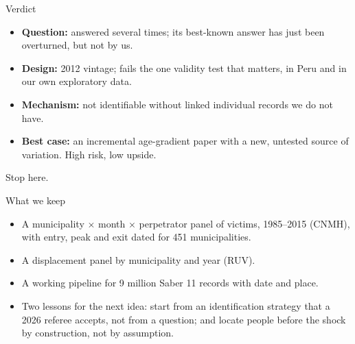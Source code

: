 \documentclass[aspectratio=169,11pt]{beamer}
\newcommand{\acc}[1]{{\color{accent}#1}}
\begin{document}
\begin{frame}{Verdict}
\begin{itemize}
\item \textbf{Question:} answered several times; its best-known answer has just been overturned, but not by us.
\item \textbf{Design:} 2012 vintage; fails the one validity test that matters, in Peru and in our own exploratory data.
\item \textbf{Mechanism:} not identifiable without linked individual records we do not have.
\item \textbf{Best case:} an incremental age-gradient paper with a new, untested source of variation. High risk, low upside.
\end{itemize}
\vspace{0.8em}
\acc{Stop here.}
\end{frame}

\begin{frame}{What we keep}
\begin{itemize}
\item A municipality $\times$ month $\times$ perpetrator panel of victims, 1985--2015 (CNMH), with entry, peak and exit dated for 451 municipalities.
\item A displacement panel by municipality and year (RUV).
\item A working pipeline for 9 million Saber 11 records with date and place.
\item Two lessons for the next idea: start from an identification strategy that a 2026 referee accepts, not from a question; and locate people before the shock by construction, not by assumption.
\end{itemize}
\end{frame}
\end{document}
